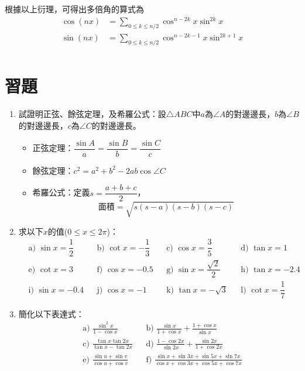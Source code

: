 \documentclass[12pt]{article}
\begin{document}
    根據以上衍理，可得出多倍角的算式為\begin{align*}
        \cos(nx)&=\sum_{0\leq k\leq n/2}\cos^{n-2k}{x}\sin^{2k}{x}\\
        \sin(nx)&=\sum_{0\leq k\leq n/2}\cos^{n-2k-1}{x}\sin^{2k+1}{x}\\
    \end{align*}

    \section*{習題}
    \begin{enumerate}
        \item 試證明正弦、餘弦定理，及希羅公式：設$\triangle ABC$中$a$為$\angle A$的對邊邊長，$b$為$\angle B$的對邊邊長，$c$為$\angle C$的對邊邊長。\begin{itemize}
            \item 正弦定理：$\dfrac{\sin{A}}{a}=\dfrac{\sin{B}}{b}=\dfrac{\sin{C}}{c}$
            \item 餘弦定理：$c^2=a^2+b^2-2ab\cos{\angle C}$
            \item 希羅公式：定義$s=\dfrac{a+b+c}{2}$，$$\textrm{面積}=\sqrt{s(s-a)(s-b)(s-c)}$$
        \end{itemize}
        \item 求以下$x$的值($0\leq x \leq 2\pi$)：\begin{align*}
            &\textrm{a) } \sin{x}=\dfrac{1}{2} && \textrm{b) } \cot{x}=-\dfrac{1}{3} && \textrm{c) } \cos{x}=\dfrac{3}{5} && \textrm{d) } \tan{x}=1\\
            &\textrm{e) } \cot{x}=3 && \textrm{f) } \cos{x}=-0.5 && \textrm{g) } \sin{x}=\dfrac{\sqrt{2}}{2} && \textrm{h) } \tan{x}=-2.4\\
            &\textrm{i) } \sin{x}=-0.4 && \textrm{j) } \cos{x}=-1 && \textrm{k) } \tan{x}=-\sqrt{3} && \textrm{l) } \cot{x}=\dfrac{1}{7}
        \end{align*}
        \item 簡化以下表達式：\begin{align*}
            &\textrm{a) } \frac{\sin^2{x}}{1-\cos{x}} && \textrm{b) } \frac{\sin{x}}{1+\cos{x}}+\frac{1+\cos{x}}{\sin{x}}\\
            &\textrm{c) } \frac{\tan{x}\tan{2x}}{\tan{x}-\tan{2x}} && \textrm{d) } \frac{1-\cos{2x}}{\sin{2x}}+\frac{\sin{2x}}{1+\cos{2x}}\\
            &\textrm{e) } \frac{\sin{u}+\sin{v}}{\cos{u}+\cos{v}} && \textrm{f) } \frac{\sin{x}+\sin{3x}+\sin{5x}+\sin{7x}}{\cos{x}+\cos{3x}+\cos{5x}+\cos{7x}}\\

\end{align*}
\end{enumerate}
\end{document}
